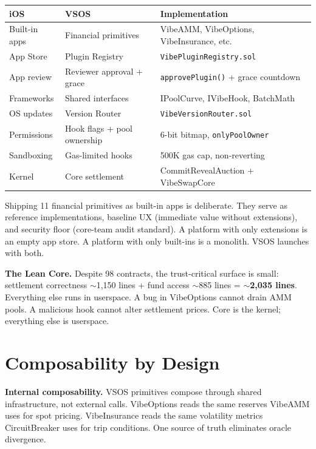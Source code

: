 \documentclass[9pt, letterpaper]{article}
\begin{document}
{\small
\renewcommand{\arraystretch}{1.05}
\begin{tabularx}{\textwidth}{@{} l l X @{}}
\toprule
\textbf{iOS} & \textbf{VSOS} & \textbf{Implementation} \\
\midrule
Built-in apps & Financial primitives & VibeAMM, VibeOptions, VibeInsurance, etc. \\
App Store & Plugin Registry & \texttt{VibePluginRegistry.sol} \\
App review & Reviewer approval + grace & \texttt{approvePlugin()} + grace countdown \\
Frameworks & Shared interfaces & IPoolCurve, IVibeHook, BatchMath \\
OS updates & Version Router & \texttt{VibeVersionRouter.sol} \\
Permissions & Hook flags + pool ownership & 6-bit bitmap, \texttt{onlyPoolOwner} \\
Sandboxing & Gas-limited hooks & 500K gas cap, non-reverting \\
Kernel & Core settlement & CommitRevealAuction + VibeSwapCore \\
\bottomrule
\end{tabularx}
}

\vspace{0.2em}
Shipping 11 financial primitives as built-in apps is deliberate. They serve as reference implementations, baseline UX (immediate value without extensions), and security floor (core-team audit standard). A platform with only extensions is an empty app store. A platform with only built-ins is a monolith. VSOS launches with both.

\textbf{The Lean Core.} Despite 98 contracts, the trust-critical surface is small: settlement correctness $\sim$1,150 lines + fund access $\sim$885 lines = \textbf{$\sim$2,035 lines}. Everything else runs in userspace. A bug in VibeOptions cannot drain AMM pools. A malicious hook cannot alter settlement prices. Core is the kernel; everything else is userspace.


\section{Composability by Design}

\textbf{Internal composability.} VSOS primitives compose through shared infrastructure, not external calls. VibeOptions reads the same reserves VibeAMM uses for spot pricing. VibeInsurance reads the same volatility metrics CircuitBreaker uses for trip conditions. One source of truth eliminates oracle divergence.
\end{document}
